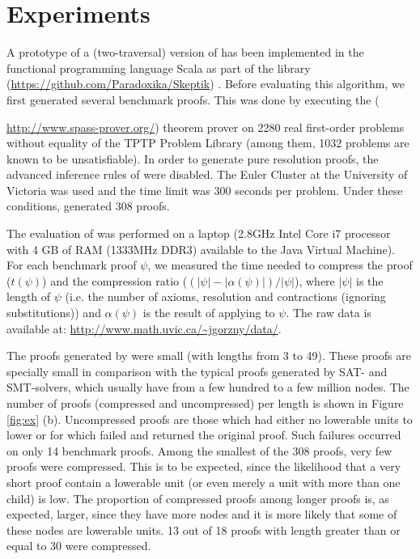 \documentclass{llncs}
\begin{document}
\section{Experiments} \label{sec:exp}
A prototype
of a (two-traversal) version of {\SFOLowerUnits} has been implemented in the functional programming language Scala
as part of the \skeptik
 library (\url{https://github.com/Paradoxika/Skeptik}) \cite{Skeptik}. 
Before evaluating this algorithm, we first generated several benchmark proofs. This was done by executing the {\SPASS} ({\url{http://www.spass-prover.org/}) theorem prover on 2280 real first-order problems without equality of the TPTP Problem Library 
(among them, 1032 problems are known to be unsatisfiable). In order to generate pure resolution proofs, the advanced inference rules of {\SPASS} were disabled. The Euler Cluster at the University of Victoria
was used and the time limit was 300 seconds per problem. Under these conditions, {\SPASS} generated 308 proofs. 

The evaluation of {\SFOLowerUnits} was performed on a laptop (2.8GHz Intel Core i7 processor with 4 GB of RAM (1333MHz DDR3) available to the Java Virtual Machine). For each benchmark proof $\psi$, we measured the time needed to compress the proof ($t(\psi)$) and the compression ratio ($(|\psi|-|\alpha(\psi)|)/|\psi|$), where $|\psi|$ is the length of $\psi$ (i.e. the number of axioms, resolution and contractions (ignoring substitutions)) and $\alpha(\psi)$ is the result of applying {\SFOLowerUnits} to $\psi$.
The raw data is available at: \url{http://www.math.uvic.ca/~jgorzny/data/}. 


The proofs generated by {\SPASS} were small (with lengths from 3 to 49). These proofs are specially small in comparison with the typical proofs generated by SAT- and SMT-solvers, which usually have from a few hundred to a few million nodes. The number of proofs (compressed and uncompressed) per length is shown in Figure \ref{fig:ex} (b). Uncompressed proofs are those which had either no lowerable units to lower or for which \SFOLowerUnits failed and returned the original proof. Such failures occurred on only 14 benchmark proofs. Among the smallest of the 308 proofs, very few proofs were compressed. This is to be expected, since the likelihood that a very short proof contain a lowerable unit (or even merely a unit with more than one child) is low. The proportion of compressed proofs among longer proofs is, as expected, larger, since they have more nodes and it is more likely that some of these nodes are lowerable units. 13 out of 18 proofs with length greater than or equal to 30 were compressed. 

}
\end{document}
